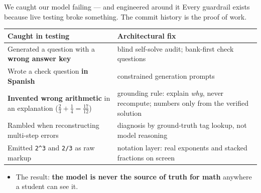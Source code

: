 \documentclass[aspectratio=169,11pt]{beamer}
\newcommand{\mutedtext}[1]{{\color{muted}#1}}
\begin{document}
\begin{frame}{We caught our model failing --- and engineered around it}
  \mutedtext{Every guardrail exists because live testing broke something. The commit history is the proof of work.}\par
  \vspace{0.3em}
  \renewcommand{\arraystretch}{1.1}
  {\small
  \begin{tabular}{@{}p{5.8cm}>{\raggedright\arraybackslash}p{7.2cm}@{}}
    \toprule
    \textbf{Caught in testing} & \textbf{Architectural fix} \\
    \midrule
    Generated a question with a \textbf{wrong answer key} & blind self-solve audit; bank-first check questions \\
    Wrote a check question \textbf{in Spanish} & constrained generation prompts \\
    \textbf{Invented wrong arithmetic} in an explanation ($\tfrac{2}{3}+\tfrac{1}{4}=\tfrac{17}{12}$) & grounding rule: explain \emph{why}, never recompute; numbers only from the verified solution \\
    Rambled when reconstructing multi-step errors & diagnosis by ground-truth tag lookup, not model reasoning \\
    Emitted \texttt{2\^{}3} and \texttt{2/3} as raw markup & notation layer: real exponents and stacked fractions on screen \\
    \bottomrule
  \end{tabular}}
  \vspace{0.25em}
  \begin{itemize}
    \item {\small The result: \textbf{the model is never the source of truth for math} anywhere a student can see it.}
  \end{itemize}
\end{frame}
\end{document}
